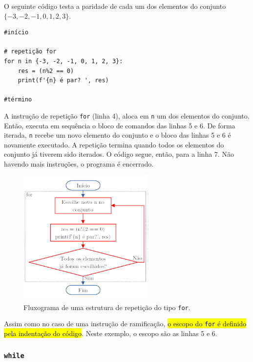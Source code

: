 \begin{ex}\label{cap_progest_sec_est:ex:for}
  O seguinte código testa a paridade de cada um dos elementos do conjunto $\{-3, -2, -1, 0, 1, 2, 3\}$.
\begin{lstlisting}
#início

# repetição for
for n in {-3, -2, -1, 0, 1, 2, 3}:
    res = (n%2 == 0)
    print(f'{n} é par? ', res)
    
#término
\end{lstlisting}
  A instrução de repetição \lstinline+for+ (linha 4), aloca em \lstinline+n+ um dos elementos do conjunto. Então, executa em sequência o bloco de comandos das linhas 5 e 6. De forma iterada, \lstinline+n+ recebe um novo elemento do conjunto e o bloco das linhas 5 e 6 é novamente executado. A repetição termina quando todos os elementos do conjunto já tiverem sido iterados. O código segue, então, para a linha 7. Não havendo mais instruções, o programa é encerrado.

\begin{figure}[H]
  \centering
  \includegraphics[width=0.6\textwidth]{./cap_progest/dados/fig_fg_for/fig}
  \caption{Fluxograma de uma estrutura de repetição do tipo \lstinline+for+.}
  \label{cap_progest_sec_est:fig:fg_for}
\end{figure}

Assim como no caso de uma instrução de ramificação, \hl{o escopo do {\lstinline+for+} é definido pela indentação do código}. Neste exemplo, o escopo são as linhas 5 e 6.
\end{ex}

\subsubsection{\lstinline+while+}

